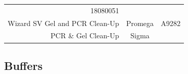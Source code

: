 \documentclass[11pt,singlespacinge,twoside]{reedthesis} %
\begin{document}
\begin{longtable}[]{@{}rcl@{}}
\begin{minipage}[t]{0.16\columnwidth}
18080051\strut
\end{minipage}\tabularnewline
\begin{minipage}[t]{0.50\columnwidth}\raggedleft
Wizard SV Gel and PCR Clean-Up\strut
\end{minipage} & \begin{minipage}[t]{0.26\columnwidth}\centering
Promega\strut
\end{minipage} & \begin{minipage}[t]{0.16\columnwidth}\raggedright
A9282\strut
\end{minipage}\tabularnewline
\begin{minipage}[t]{0.50\columnwidth}\raggedleft
PCR \& Gel Clean-Up\strut
\end{minipage} & \begin{minipage}[t]{0.26\columnwidth}\centering
Sigma\strut
\end{minipage} & \begin{minipage}[t]{0.16\columnwidth}\raggedright
\strut
\end{minipage}\tabularnewline
\bottomrule
\end{longtable}
\hypertarget{mat-buff}{%
\subsection{Buffers}\label{mat-buff}}
\end{document}
